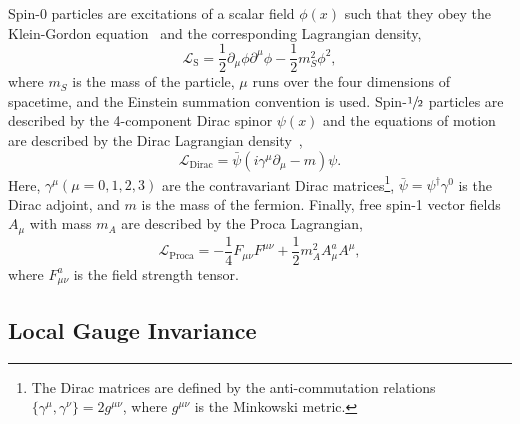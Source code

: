 Spin-0 particles are excitations of a scalar field $\phi(x)$ such that they obey the Klein-Gordon equation~\cite{Klein1926} and the corresponding Lagrangian density,
\begin{equation}
	\label{eq:scalar_lagrangian}
	\mathcal{L}_\text{S} = \frac{1}{2} \partial_\mu \phi \partial^\mu \phi - \frac{1}{2} m_S^2 \phi^2,
\end{equation}
where $m_S$ is the mass of the particle, $\mu$ runs over the four dimensions of spacetime, and the Einstein summation convention is used.
Spin-$\sfrac{1}{2}$ particles are described by the 4-component Dirac spinor $\psi(x)$ and the equations of motion are described by the Dirac Lagrangian density~\cite{Dirac1928},
\begin{equation}
	\label{eq:dirac_lagrangian}
	\mathcal{L}_\text{Dirac} = \bar{\psi} (i \gamma^\mu \partial_\mu - m) \psi.
\end{equation}
Here, $\gamma^\mu(\mu=0,1,2,3)$ are the contravariant Dirac matrices\footnote{The Dirac matrices are defined by the anti-commutation relations$\{ \gamma^\mu, \gamma^\nu \} = 2 g^{\mu\nu}$, where $g^{\mu\nu}$ is the Minkowski metric.}, $\bar{\psi} = \psi^\dagger \gamma^0$ is the Dirac adjoint, and $m$ is the mass of the fermion.
Finally, free spin-1 vector fields $A_\mu$ with mass $m_A$ are described by the Proca Lagrangian,
\begin{equation}
	\label{eq:proca_lagrangian}
	\mathcal{L}_\text{Proca} = -\frac{1}{4} F_{\mu\nu} F^{\mu\nu} + \frac{1}{2} m_A^2 A_\mu^a A^{\mu},
\end{equation}
where $F_{\mu\nu}^a$ is the field strength tensor.

\subsection{Local Gauge Invariance}


